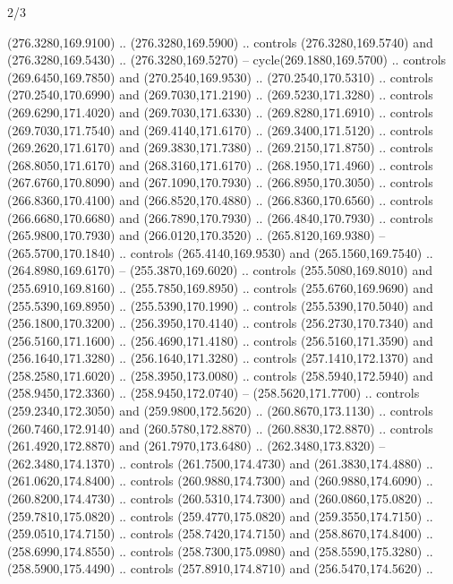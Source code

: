 \begin{flagdescription}{2/3}
\begin{scope}[xshift=0.5\flaglength,yshift=0.5\flagwidth,scale=\flagwidth/259.2]
\begin{scope}[y=0.8pt, x=0.8pt, yscale=-1,shift={(-243,-162)}]
      (276.3280,169.9100) .. (276.3280,169.5900) .. controls (276.3280,169.5740) and
      (276.3280,169.5430) .. (276.3280,169.5270) -- cycle(269.1880,169.5700) ..
      controls (269.6450,169.7850) and (270.2540,169.9530) .. (270.2540,170.5310) ..
      controls (270.2540,170.6990) and (269.7030,171.2190) .. (269.5230,171.3280) ..
      controls (269.6290,171.4020) and (269.7030,171.6330) .. (269.8280,171.6910) ..
      controls (269.7030,171.7540) and (269.4140,171.6170) .. (269.3400,171.5120) ..
      controls (269.2620,171.6170) and (269.3830,171.7380) .. (269.2150,171.8750) ..
      controls (268.8050,171.6170) and (268.3160,171.6170) .. (268.1950,171.4960) ..
      controls (267.6760,170.8090) and (267.1090,170.7930) .. (266.8950,170.3050) ..
      controls (266.8360,170.4100) and (266.8520,170.4880) .. (266.8360,170.6560) ..
      controls (266.6680,170.6680) and (266.7890,170.7930) .. (266.4840,170.7930) ..
      controls (265.9800,170.7930) and (266.0120,170.3520) .. (265.8120,169.9380) --
      (265.5700,170.1840) .. controls (265.4140,169.9530) and (265.1560,169.7540) ..
      (264.8980,169.6170) -- (255.3870,169.6020) .. controls (255.5080,169.8010) and
      (255.6910,169.8160) .. (255.7850,169.8950) .. controls (255.6760,169.9690) and
      (255.5390,169.8950) .. (255.5390,170.1990) .. controls (255.5390,170.5040) and
      (256.1800,170.3200) .. (256.3950,170.4140) .. controls (256.2730,170.7340) and
      (256.5160,171.1600) .. (256.4690,171.4180) .. controls (256.5160,171.3590) and
      (256.1640,171.3280) .. (256.1640,171.3280) .. controls (257.1410,172.1370) and
      (258.2580,171.6020) .. (258.3950,173.0080) .. controls (258.5940,172.5940) and
      (258.9450,172.3360) .. (258.9450,172.0740) -- (258.5620,171.7700) .. controls
      (259.2340,172.3050) and (259.9800,172.5620) .. (260.8670,173.1130) .. controls
      (260.7460,172.9140) and (260.5780,172.8870) .. (260.8830,172.8870) .. controls
      (261.4920,172.8870) and (261.7970,173.6480) .. (262.3480,173.8320) --
      (262.3480,174.1370) .. controls (261.7500,174.4730) and (261.3830,174.4880) ..
      (261.0620,174.8400) .. controls (260.9880,174.7300) and (260.9880,174.6090) ..
      (260.8200,174.4730) .. controls (260.5310,174.7300) and (260.0860,175.0820) ..
      (259.7810,175.0820) .. controls (259.4770,175.0820) and (259.3550,174.7150) ..
      (259.0510,174.7150) .. controls (258.7420,174.7150) and (258.8670,174.8400) ..
      (258.6990,174.8550) .. controls (258.7300,175.0980) and (258.5590,175.3280) ..
      (258.5900,175.4490) .. controls (257.8910,174.8710) and (256.5470,174.5620) ..

\end{scope}
\end{scope}
\end{flagdescription}
